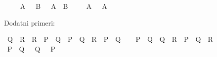 \begin{isabellebody}
\begin{exercise}[subtitle=Dokazi u prirodnoj dedukciji]
\ \ %
\isadelimproof
%
\endisadelimproof
%
\isatagproof
%
\endisatagproof
{\isafoldproof}%
%
\isadelimproof
%
\endisadelimproof
\isanewline
{}\isamarkupfalse%
\ {\isachardoublequoteopen}{\isasymnot}\ A\ {\isasymand}\ {\isasymnot}\ B\ {\isasymlongrightarrow}\ {\isasymnot}\ {\isacharparenleft}{\kern0pt}A\ {\isasymor}\ B{\isacharparenright}{\kern0pt}{\isachardoublequoteclose}\isanewline
\ \ %
\isadelimproof
%
\endisadelimproof
%
\isatagproof
%
\endisatagproof
{\isafoldproof}%
%
\isadelimproof
%
\endisadelimproof
\isanewline
{}\isamarkupfalse%
\ {\isachardoublequoteopen}{\isasymnot}\ {\isacharparenleft}{\kern0pt}A\ {\isasymlongleftrightarrow}\ {\isasymnot}\ A{\isacharparenright}{\kern0pt}{\isachardoublequoteclose}\isanewline
\ \ %
\isadelimproof
%
\endisadelimproof
%
\isatagproof
%
\endisatagproof
{\isafoldproof}%
%
\isadelimproof
%
\endisadelimproof
%
\begin{isamarkuptext}%
Dodatni primeri:%
\end{isamarkuptext}\isamarkuptrue%
\isamarkupfalse%
\ {\isachardoublequoteopen}{\isacharparenleft}{\kern0pt}Q\ {\isasymlongrightarrow}\ R{\isacharparenright}{\kern0pt}\ {\isasymand}\ {\isacharparenleft}{\kern0pt}R\ {\isasymlongrightarrow}\ P\ {\isasymand}\ Q{\isacharparenright}{\kern0pt}\ {\isasymand}\ {\isacharparenleft}{\kern0pt}P\ {\isasymlongrightarrow}\ Q\ {\isasymor}\ R{\isacharparenright}{\kern0pt}\ {\isasymlongrightarrow}\ {\isacharparenleft}{\kern0pt}P\ {\isasymlongleftrightarrow}\ Q{\isacharparenright}{\kern0pt}{\isachardoublequoteclose}\isanewline
\ \ %
\isadelimproof
%
\endisadelimproof
%
\isatagproof
%
\endisatagproof
{\isafoldproof}%
%
\isadelimproof
%
\endisadelimproof
\isanewline
{}\isamarkupfalse%
\ {\isachardoublequoteopen}{\isacharparenleft}{\kern0pt}P\ {\isasymlongrightarrow}\ Q{\isacharparenright}{\kern0pt}\ {\isasymand}\ {\isacharparenleft}{\kern0pt}Q\ {\isasymlongrightarrow}\ R{\isacharparenright}{\kern0pt}\ {\isasymlongrightarrow}\ {\isacharparenleft}{\kern0pt}P\ {\isasymlongrightarrow}\ Q\ {\isasymand}\ R{\isacharparenright}{\kern0pt}{\isachardoublequoteclose}\isanewline
\ \ %
\isadelimproof
%
\endisadelimproof
%
\isatagproof
%
\endisatagproof
{\isafoldproof}%
%
\isadelimproof
%
\endisadelimproof
\isanewline
{}\isamarkupfalse%
\ {\isachardoublequoteopen}{\isacharparenleft}{\kern0pt}P\ {\isasymlongrightarrow}\ Q{\isacharparenright}{\kern0pt}\ {\isasymand}\ {\isasymnot}\ Q\ {\isasymlongrightarrow}\ {\isasymnot}\ P{\isachardoublequoteclose}\isanewline
\ \ %
\isadelimproof
%
\endisadelimproof

\end{exercise}
\end{isabellebody}
